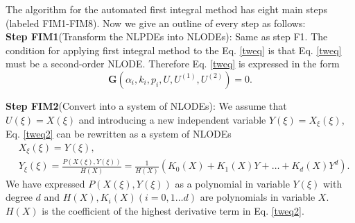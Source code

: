 \documentclass[prd,aps,floats,showkeys,nofootinbib,notitlepage]{revtex4}
\begin{document}
	The algorithm for the automated first integral method has eight main steps (labeled FIM1-FIM8). Now we give an outline of every step as follows:\\
	
	\textbf{Step FIM1}(Transform the NLPDEs into NLODEs): Same as step F1. The condition for applying first integral method to the Eq. \eqref{tweq} is that Eq. \eqref{tweq} must be a second-order NLODE. Therefore Eq. \eqref{tweq} is expressed in the form
	\begin{equation}\label{tweq2}
		\mathbf{G} \left( {\alpha_i,k_i,p_i,U,U^{(1)},U^{(2)}} \right) = 0.
	\end{equation}
	
	\textbf{Step FIM2}(Convert into a system of NLODEs): We assume that $U(\xi)=X(\xi)$ and introducing a new independent variable $Y(\xi) = X_{\xi}(\xi)$, Eq. \eqref{tweq2} can be rewritten as a system of NLODEs \cite{fim0}
	\begin{subequations}\label{sysode}
		\begin{align}
			&X_{\xi}(\xi)= Y(\xi),\label{sysode1}\\
			&Y_{\xi}(\xi)= \frac{P(X(\xi),Y(\xi))}{H(X)} = \frac{1}{H(X)}\left(K_0(X)+K_1(X)Y+\ldots+K_d(X)Y^d\right)\label{sysode2}.
		\end{align}
	\end{subequations}
	We have expressed $P(X(\xi),Y(\xi))$ as a polynomial in variable $Y(\xi)$ with degree $d$ and $H(X),K_i(X)(i=0,1\ldots d)$ are polynomials in variable $X$.
	$H(X)$ is the coefficient of the highest derivative term in Eq. \eqref{tweq2}.\\
	
\end{document}

